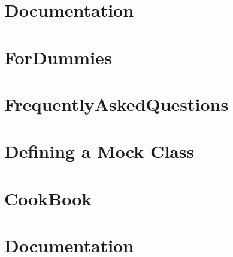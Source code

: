 \documentclass[twoside]{book}
\newcommand{\+}{\discretionary{\mbox{\scriptsize$\hookleftarrow$}}{}{}}
\begin{document}
\chapter{Documentation}
\label{md__home_bhargavi_Documents_SDR_Copy_Exam_808X_vendor_googletest_googlemock_docs_v1_6_Documentation}
\hypertarget{md__home_bhargavi_Documents_SDR_Copy_Exam_808X_vendor_googletest_googlemock_docs_v1_6_Documentation}{}

\chapter{For\+Dummies}
\label{md__home_bhargavi_Documents_SDR_Copy_Exam_808X_vendor_googletest_googlemock_docs_v1_6_ForDummies}
\hypertarget{md__home_bhargavi_Documents_SDR_Copy_Exam_808X_vendor_googletest_googlemock_docs_v1_6_ForDummies}{}

\chapter{Frequently\+Asked\+Questions}
\label{md__home_bhargavi_Documents_SDR_Copy_Exam_808X_vendor_googletest_googlemock_docs_v1_6_FrequentlyAskedQuestions}
\hypertarget{md__home_bhargavi_Documents_SDR_Copy_Exam_808X_vendor_googletest_googlemock_docs_v1_6_FrequentlyAskedQuestions}{}

\chapter{Defining a Mock Class}
\label{md__home_bhargavi_Documents_SDR_Copy_Exam_808X_vendor_googletest_googlemock_docs_v1_7_CheatSheet}
\hypertarget{md__home_bhargavi_Documents_SDR_Copy_Exam_808X_vendor_googletest_googlemock_docs_v1_7_CheatSheet}{}

\chapter{Cook\+Book}
\label{md__home_bhargavi_Documents_SDR_Copy_Exam_808X_vendor_googletest_googlemock_docs_v1_7_CookBook}
\hypertarget{md__home_bhargavi_Documents_SDR_Copy_Exam_808X_vendor_googletest_googlemock_docs_v1_7_CookBook}{}

\chapter{Documentation}
\label{md__home_bhargavi_Documents_SDR_Copy_Exam_808X_vendor_googletest_googlemock_docs_v1_7_Documentation}
\hypertarget{md__home_bhargavi_Documents_SDR_Copy_Exam_808X_vendor_googletest_googlemock_docs_v1_7_Documentation}{}

\end{document}
